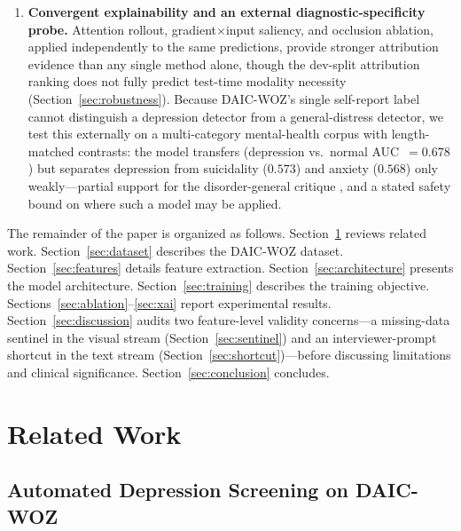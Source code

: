 \documentclass[5p,twocolumn]{elsarticle}
\begin{document}
\begin{enumerate}
  \item \textbf{Convergent explainability and an external
  diagnostic-specificity probe.} Attention rollout,
  gradient$\times$input saliency, and occlusion ablation, applied
  independently to the same predictions, provide stronger attribution
  evidence than any single method alone, though the dev-split
  attribution ranking does not fully predict test-time modality
  necessity (Section~\ref{sec:robustness}). Because DAIC-WOZ's single
  self-report label cannot distinguish a depression detector from a
  general-distress detector, we test this externally on a
  multi-category mental-health corpus with length-matched contrasts:
  the model transfers (depression vs.\ normal AUC~$=0.678$) but
  separates depression from suicidality ($0.573$) and anxiety
  ($0.568$) only weakly---partial support for the disorder-general
  critique \cite{patapati2025invalid}, and a stated safety bound on
  where such a model may be applied.
\end{enumerate}

The remainder of the paper is organized as follows.
Section~\ref{sec:related} reviews related work.
Section~\ref{sec:dataset} describes the DAIC-WOZ dataset.
Section~\ref{sec:features} details feature extraction.
Section~\ref{sec:architecture} presents the model architecture.
Section~\ref{sec:training} describes the training objective.
Sections~\ref{sec:ablation}--\ref{sec:xai} report experimental results.
Section~\ref{sec:discussion} audits two feature-level validity
concerns---a missing-data sentinel in the visual stream
(Section~\ref{sec:sentinel}) and an interviewer-prompt shortcut in the
text stream (Section~\ref{sec:shortcut})---before discussing limitations
and clinical significance. Section~\ref{sec:conclusion} concludes.

\section{Related Work}
\label{sec:related}

\subsection{Automated Depression Screening on DAIC-WOZ}
\end{document}
